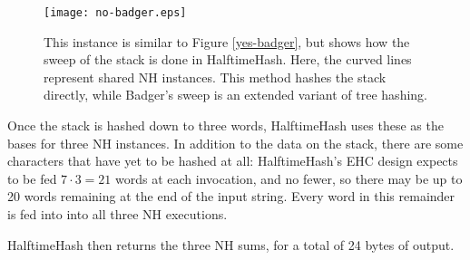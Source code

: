 \documentclass[runningheads]{llncs}
\begin{document}
\begin{figure}
\texttt{[image: no-badger.eps]}
\caption{\label{no-badger}
  This instance is similar to Figure \ref{yes-badger}, but shows how the sweep of the stack is done in HalftimeHash.
  Here, the curved lines represent shared NH instances.
  This method hashes the stack directly, while Badger's sweep is an extended variant of tree hashing.
}
\end{figure}

Once the stack is hashed down to three words, HalftimeHash uses these as the bases for three NH instances.
In addition to the data on the stack, there are some characters that have yet to be hashed at all: HalftimeHash's EHC design expects to be fed $7 \cdot 3 = 21$ words at each invocation, and no fewer, so there may be up to 20 words remaining at the end of the input string.
Every word in this remainder is fed into into all three NH executions.

HalftimeHash then returns the three NH sums, for a total of 24 bytes of output.






\end{document}
